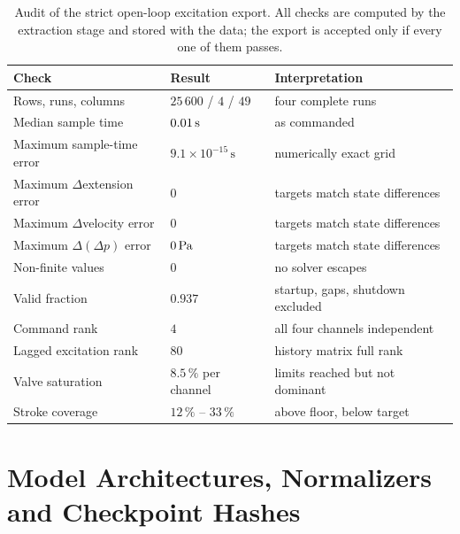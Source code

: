 \begin{table}[htbp]
  \centering
  \caption{Audit of the strict open-loop excitation export. All checks
  are computed by the extraction stage and stored with the data; the
  export is accepted only if every one of them passes.}
  \label{tab:data:audit}
  \small
  \begin{tabular}{lll}
    \toprule
    Check & Result & Interpretation \\
    \midrule
    Rows, runs, columns & $25\,600$ / $4$ / $49$ & four complete runs \\
    Median sample time & $\unit[0.01]{s}$ & as commanded \\
    Maximum sample-time error & $9.1\times10^{-15}\,\mathrm{s}$ & numerically exact grid \\
    Maximum $\Delta$extension error & $0$ & targets match state differences \\
    Maximum $\Delta$velocity error & $0$ & targets match state differences \\
    Maximum $\Delta(\Delta p)$ error & $\unit[0]{Pa}$ & targets match state differences \\
    Non-finite values & $0$ & no solver escapes \\
    Valid fraction & $0.937$ & startup, gaps, shutdown excluded \\
    Command rank & $4$ & all four channels independent \\
    Lagged excitation rank & $80$ & history matrix full rank \\
    Valve saturation & $8.5\,\%$ per channel & limits reached but not dominant \\
    Stroke coverage & $12\,\%$ -- $33\,\%$ & above floor, below target \\
    \bottomrule
  \end{tabular}
\end{table}


\chapter{Model Architectures, Normalizers and Checkpoint Hashes}
\label{app:models}

